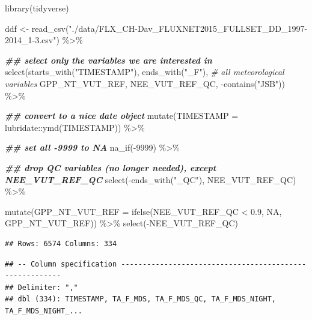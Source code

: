 \documentclass[
]{book}
\newenvironment{Shaded}{\begin{snugshade}}{\end{snugshade}}
\newcommand{\AttributeTok}[1]{\textcolor[rgb]{0.77,0.63,0.00}{#1}}
\newcommand{\CommentTok}[1]{\textcolor[rgb]{0.56,0.35,0.01}{\textit{#1}}}
\newcommand{\ConstantTok}[1]{\textcolor[rgb]{0.00,0.00,0.00}{#1}}
\newcommand{\DecValTok}[1]{\textcolor[rgb]{0.00,0.00,0.81}{#1}}
\newcommand{\DocumentationTok}[1]{\textcolor[rgb]{0.56,0.35,0.01}{\textbf{\textit{#1}}}}
\newcommand{\FloatTok}[1]{\textcolor[rgb]{0.00,0.00,0.81}{#1}}
\newcommand{\FunctionTok}[1]{\textcolor[rgb]{0.00,0.00,0.00}{#1}}
\newcommand{\NormalTok}[1]{#1}
\newcommand{\OtherTok}[1]{\textcolor[rgb]{0.56,0.35,0.01}{#1}}
\newcommand{\SpecialCharTok}[1]{\textcolor[rgb]{0.00,0.00,0.00}{#1}}
\newcommand{\StringTok}[1]{\textcolor[rgb]{0.31,0.60,0.02}{#1}}
\begin{document}
\begin{Shaded}
\begin{Highlighting}[]
\FunctionTok{library}\NormalTok{(tidyverse)}

\NormalTok{ddf }\OtherTok{\textless{}{-}} \FunctionTok{read\_csv}\NormalTok{(}\StringTok{"./data/FLX\_CH{-}Dav\_FLUXNET2015\_FULLSET\_DD\_1997{-}2014\_1{-}3.csv"}\NormalTok{) }\SpecialCharTok{\%\textgreater{}\%} 
  
  \DocumentationTok{\#\# select only the variables we are interested in}
  \FunctionTok{select}\NormalTok{(}\FunctionTok{starts\_with}\NormalTok{(}\StringTok{"TIMESTAMP"}\NormalTok{),}
         \FunctionTok{ends\_with}\NormalTok{(}\StringTok{"\_F"}\NormalTok{),   }\CommentTok{\# all meteorological variables}
\NormalTok{         GPP\_NT\_VUT\_REF,}
\NormalTok{         NEE\_VUT\_REF\_QC,}
         \SpecialCharTok{{-}}\FunctionTok{contains}\NormalTok{(}\StringTok{"JSB"}\NormalTok{)) }\SpecialCharTok{\%\textgreater{}\%}

  \DocumentationTok{\#\# convert to a nice date object}
  \FunctionTok{mutate}\NormalTok{(}\AttributeTok{TIMESTAMP =}\NormalTok{ lubridate}\SpecialCharTok{::}\FunctionTok{ymd}\NormalTok{(TIMESTAMP)) }\SpecialCharTok{\%\textgreater{}\%}

  \DocumentationTok{\#\# set all {-}9999 to NA}
  \FunctionTok{na\_if}\NormalTok{(}\SpecialCharTok{{-}}\DecValTok{9999}\NormalTok{) }\SpecialCharTok{\%\textgreater{}\%}

  \DocumentationTok{\#\# drop QC variables (no longer needed), except NEE\_VUT\_REF\_QC}
  \FunctionTok{select}\NormalTok{(}\SpecialCharTok{{-}}\FunctionTok{ends\_with}\NormalTok{(}\StringTok{"\_QC"}\NormalTok{), NEE\_VUT\_REF\_QC) }\SpecialCharTok{\%\textgreater{}\%} 

  \FunctionTok{mutate}\NormalTok{(}\AttributeTok{GPP\_NT\_VUT\_REF =} \FunctionTok{ifelse}\NormalTok{(NEE\_VUT\_REF\_QC }\SpecialCharTok{\textless{}} \FloatTok{0.9}\NormalTok{, }\ConstantTok{NA}\NormalTok{, GPP\_NT\_VUT\_REF)) }\SpecialCharTok{\%\textgreater{}\%} 
  \FunctionTok{select}\NormalTok{(}\SpecialCharTok{{-}}\NormalTok{NEE\_VUT\_REF\_QC)}
\end{Highlighting}
\end{Shaded}

\begin{verbatim}
## Rows: 6574 Columns: 334
\end{verbatim}

\begin{verbatim}
## -- Column specification --------------------------------------------------------
## Delimiter: ","
## dbl (334): TIMESTAMP, TA_F_MDS, TA_F_MDS_QC, TA_F_MDS_NIGHT, TA_F_MDS_NIGHT_...
\end{verbatim}
\end{document}
